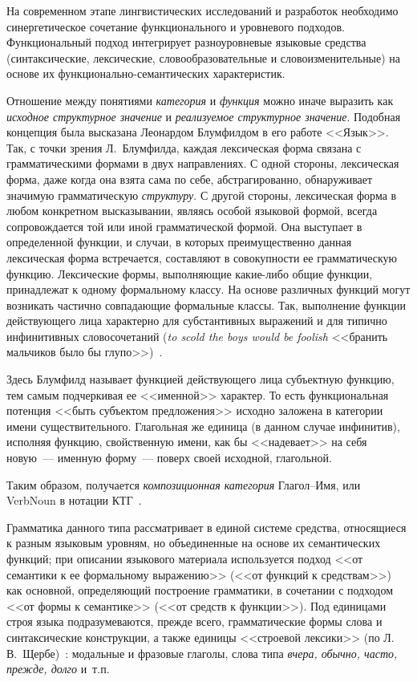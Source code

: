 \begin{multicols}{2}
На современном этапе лингвистических исследований и разработок
необходимо синергетическое сочетание функционального и уровневого
подходов. Функциональный подход интегрирует разноуровневые языковые
средства (синтаксические, лексические, словообразовательные и
словоизменительные) на основе их функционально-семантических
характеристик.

Отношение между понятиями \textit{категория} и \textit{функция} можно иначе 
выразить как \textit{исходное структурное значение} и \textit{реализуемое 
структурное значение}. Подобная концепция была высказана Леонардом Блумфилдом в 
его работе <<Язык>>. Так, с точки зрения Л.~Блумфилда, каждая лексическая форма 
связана с грамматическими формами в двух направлениях. С одной стороны, 
лек\-си\-че\-ская форма, даже когда она взята сама по себе, абстрагированно, 
обнаруживает значимую грамматическую \textit{структуру}. С другой стороны, 
лексическая форма в любом конкретном высказывании, являясь особой языковой 
формой, всегда сопровождается той или иной грамматической формой. Она выступает 
в определенной функции, и случаи, в которых преимущественно данная лексическая 
форма встречается, составляют в совокупности ее грамматическую функцию. 
Лексические формы, выпол\-ня\-ющие какие-либо общие функции, принадлежат к 
одному формальному классу. На основе различных функций могут возникать частично 
совпадающие формальные классы. Так, выполнение функции действующего лица 
характерно для субстантивных выражений и для типично инфинитивных 
словосочетаний (\textit{to scold the boys would be foolish} <<бранить мальчиков 
было бы глупо>>)~\cite{22koz}. {

}

Здесь Блумфилд называет функцией дей\-ст\-ву\-юще\-го лица субъектную
функцию, тем самым подчеркивая ее <<именной>> характер. То есть
функциональная потенция <<быть субъектом предложения>> исходно заложена
в категории имени существительного. Глагольная же единица (в данном
случае инфинитив), исполняя функцию, свойственную имени, как бы
<<надевает>> на себя новую~--- именную форму~--- поверх своей исходной,
глагольной.

Таким образом, получается \textit{композиционная категория}
Глагол--Имя, или VerbNoun в нотации КТГ~\cite{12koz}.

Грамматика данного типа рассматривает в единой системе средства,
относящиеся к разным языковым уровням, но объединенные на основе их
семантических функций; при описании языкового материала используется
подход <<от семантики к ее формальному выражению>> (<<от функций  к
средствам>>) как основной, определяющий построение грамматики, в
сочетании с подходом <<от формы к семантике>> (<<от средств к
функции>>).  Под единицами строя языка подразумеваются, прежде всего,
грамматические формы слова и синтаксические конструкции, а также
единицы <<строевой лексики>> (по Л.\,В.~Щербе)~\cite{23koz}:
модальные и фразовые глаголы, слова типа \textit{вчера, обычно, часто,
прежде, долго} и~т.п.


\end{multicols}
